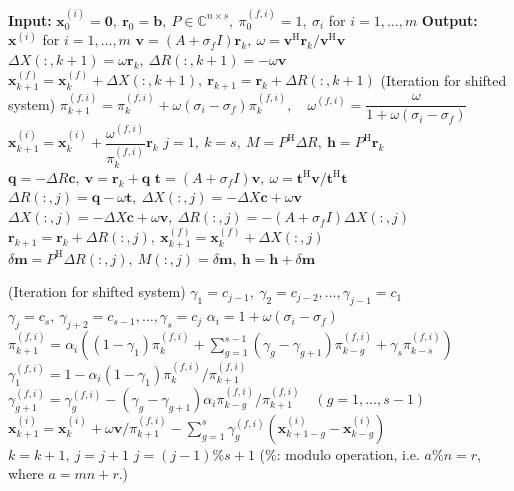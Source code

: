 \begin{algorithm}[H]\caption{{The shifted IDR($s$) method (Seed system: $(A+\sigma_f I)\bm x=\bm b$)}}\label{alg:shifted-idr}\begin{algorithmic}[1]
\Statex\textbf{Input:} $\bm x_0^{(i)}=\bm0,\ \bm r_0=\bm b,\ P\in\mathbb C^{n\times s},\ \pi_0^{(f,i)}=1,\ \sigma_i$ {for} $i=1,\ldots,m$
\Statex\textbf{Output:} $\bm x^{(i)}$ {for} $i=1,\ldots,m$
\State $\bm v=(A+\sigma_f I)\bm r_k,\ \omega=\bm v^{\mathrm H}\bm r_k/\bm v^{\mathrm H}\bm v$
\State $\Delta X(:,k+1)=\omega\bm r_k,\ \Delta R(:,k+1)=-\omega\bm v$
\State $\bm x_{k+1}^{(f)}=\bm x_k^{(f)}+\Delta X(:,k+1),\ \bm r_{k+1}=\bm r_k+\Delta R(:,k+1)$
\State ({Iteration for shifted system})
\State $\pi_{k+1}^{(f,i)}=\pi_k^{(f,i)}+\omega(\sigma_i-\sigma_f)\pi_k^{(f,i)},\quad\omega^{(f,i)}=\dfrac{\omega}{1+\omega(\sigma_i-\sigma_f)}$
\State $\bm x_{k+1}^{(i)}=\bm x_k^{(i)}+\dfrac{\omega^{(f,i)}}{\pi_k^{(f,i)}}\bm r_k$
\EndIf\EndFor\EndFor
\State $j=1,\ k=s,\ M=P^{\mathrm H}\Delta R,\ \bm h=P^{\mathrm H}\bm r_k$
\State $\bm q=-\Delta R\bm c,\ \bm v=\bm r_k+\bm q$
\State $\bm t=(A+\sigma_f I)\bm v,\ \omega=\bm t^{\mathrm H}\bm v/\bm t^{\mathrm H}\bm t$
\State $\Delta R(:,j)=\bm q-\omega\bm t,\ \Delta X(:,j)=-\Delta X\bm c+\omega\bm v$
\Else
\State $\Delta X(:,j)=-\Delta X\bm c+\omega\bm v,\ \Delta R(:,j)=-(A+\sigma_f I)\Delta X(:,j)$
\EndIf
\State $\bm r_{k+1}=\bm r_k+\Delta R(:,j),\ \bm x_{k+1}^{(f)}=\bm x_k^{(f)}+\Delta X(:,j)$
\State $\delta\bm m=P^{\mathrm H}\Delta R(:,j),\ M(:,j)=\delta\bm m,\ \bm h=\bm h+\delta\bm m$
\end{algorithmic}\end{algorithm}
\begin{algorithm}[H]\ContinuedFloat\caption[]{{The shifted IDR($s$) method (continued)}}\begin{algorithmic}[1]
\State ({Iteration for shifted system})
\State $\gamma_1=c_{j-1},\ \gamma_2=c_{j-2},\ldots,\gamma_{j-1}=c_1$
\State $\gamma_j=c_s,\ \gamma_{j+2}=c_{s-1},\ldots,\gamma_s=c_j$
\State $\alpha_i=1+\omega(\sigma_i-\sigma_f)$
\State $\pi_{k+1}^{(f,i)}=\alpha_i\left((1-\gamma_1)\pi_k^{(f,i)}+\sum_{g=1}^{s-1}(\gamma_g-\gamma_{g+1})\pi_{k-g}^{(f,i)}+\gamma_s\pi_{k-s}^{(f,i)}\right)$
\State $\gamma_1^{(f,i)}=1-\alpha_i(1-\gamma_1)\pi_k^{(f,i)}/\pi_{k+1}^{(f,i)}$
\State $\gamma_{g+1}^{(f,i)}=\gamma_g^{(f,i)}-(\gamma_g-\gamma_{g+1})\alpha_i\pi_{k-g}^{(f,i)}/\pi_{k+1}^{(f,i)}\quad(g=1,\ldots,s-1)$
\State $\bm x_{k+1}^{(i)}=\bm x_k^{(i)}+\omega\bm v/\pi_{k+1}^{(f,i)}-\sum_{g=1}^{s}\gamma_g^{(f,i)}(\bm x_{k+1-g}^{(i)}-\bm x_{k-g}^{(i)})$
\EndIf\EndFor
\State $k=k+1,\ j=j+1$
\State $j=(j-1)\%s+1$ {($\%$: modulo operation, i.e. $a\%n=r$, where $a=mn+r$.)}
\EndFor\EndWhile\end{algorithmic}\end{algorithm}
